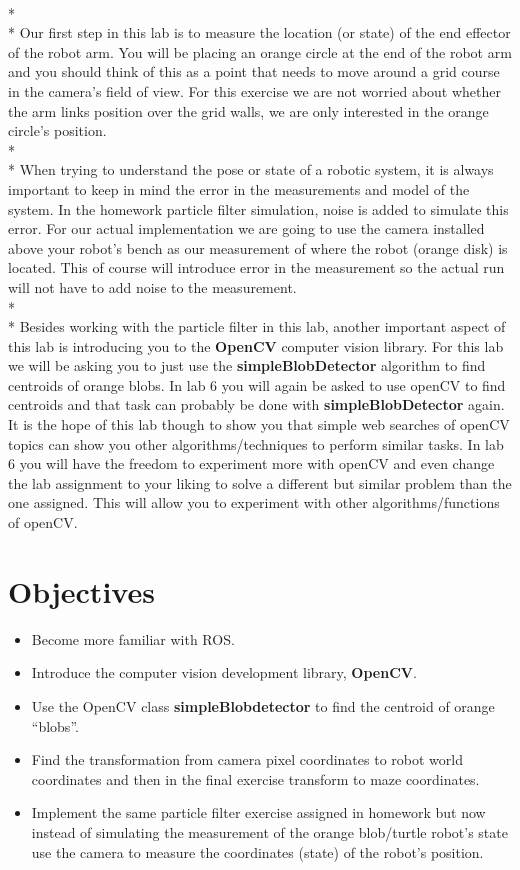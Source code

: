 \\* 
\\* Our first step in this lab is to measure the location (or state) of the end effector of the robot arm.  You will be placing an orange circle at the end of the robot arm and you should think of this as a point that needs to move around a grid course in the camera's field of view.  For this exercise we are not worried about whether the arm links position over the grid walls, we are only interested in the orange circle's position.  
\\* 
\\* When trying to understand the pose or state of a robotic system, it is always important to keep in mind the error in the measurements and model of the system.  In the homework particle filter simulation, noise is added to simulate this error.  For our actual implementation we are going to use the camera installed above your robot's bench as our measurement of where the robot (orange disk) is located.  This of course will introduce error in the measurement so the actual run will not have to add noise to the measurement.  
\\* 
\\* Besides working with the particle filter in this lab, another important aspect of this lab is introducing you to the \textbf{OpenCV} computer vision library.  For this lab we will be asking you to just use the \textbf{simpleBlobDetector} algorithm to find centroids of orange blobs.  In lab 6 you will again be asked to use openCV to find centroids and that task can probably be done with \textbf{simpleBlobDetector} again.  It is the hope of this lab though to show you that simple web searches of openCV topics can show you other algorithms/techniques to perform similar tasks.  In lab 6 you will have the freedom to experiment more with openCV and even change the lab assignment to your liking to solve a different but similar problem than the one assigned. This will allow you to experiment with other algorithms/functions of openCV.

\section{Objectives}
\begin{itemize}
    \item Become more familiar with ROS.
    \item Introduce the computer vision development library, \textbf{OpenCV}. 
    \item Use the OpenCV class \textbf{simpleBlobdetector} to find the centroid of orange ``blobs”.  
    \item Find the transformation from camera pixel coordinates to robot world coordinates and then in the final exercise transform to maze coordinates. 
    \item Implement the same particle filter exercise assigned in homework but now instead of simulating the measurement of the orange blob/turtle robot's state use the camera to measure the coordinates (state) of the robot's position. 
\end{itemize}

